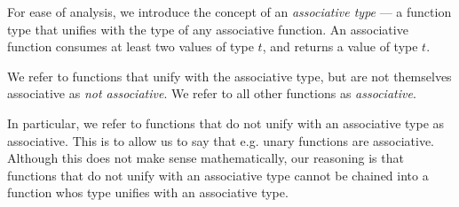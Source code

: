 For ease of analysis, we introduce the concept of an \emph{associative type}
--- a function type that unifies with the type of any associative function. An
associative function consumes at least two values of type $t$, and returns a
value of type $t$.

We refer to functions that unify with the associative type, but are not
themselves associative as \emph{not associative}. We refer to all other
functions as \emph{associative}.

In particular, we refer to functions that do not unify with an associative type
as associative. This is to allow us to say that e.g. unary functions are
associative. Although this does not make sense mathematically, our reasoning is
that functions that do not unify with an associative type cannot be chained
into a function whos type unifies with an associative type.

